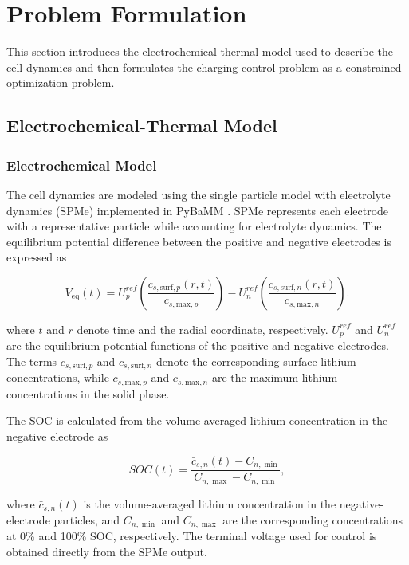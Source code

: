 \section{Problem Formulation}

This section introduces the electrochemical-thermal model used to describe the cell dynamics and then formulates the charging control problem as a constrained optimization problem.

\subsection{Electrochemical-Thermal Model}

\subsubsection{Electrochemical Model}

The cell dynamics are modeled using the single particle model with electrolyte dynamics (SPMe) implemented in PyBaMM \cite{23,25}. SPMe represents each electrode with a representative particle while accounting for electrolyte dynamics. The equilibrium potential difference between the positive and negative electrodes is expressed as

\begin{equation}\label{eqn:voltage}
    V_{\mathrm{eq}}(t)
    =
    U^{ref}_{p}
    \left(
    \frac{c_{s,\mathrm{surf},p}(r,t)}
    {c_{s,\mathrm{max},p}}
    \right)
    -
    U^{ref}_{n}
    \left(
    \frac{c_{s,\mathrm{surf},n}(r,t)}
    {c_{s,\mathrm{max},n}}
    \right).
\end{equation}

where $t$ and $r$ denote time and the radial coordinate, respectively. 
$U^{ref}_{p}$ and $U^{ref}_{n}$ are the equilibrium-potential functions of the positive and negative electrodes. 
The terms $c_{s,\mathrm{surf},p}$ and $c_{s,\mathrm{surf},n}$ denote the corresponding surface lithium concentrations, while $c_{s,\mathrm{max},p}$ and $c_{s,\mathrm{max},n}$ are the maximum lithium concentrations in the solid phase.

The SOC is calculated from the volume-averaged lithium concentration in the negative electrode as

\begin{equation}
    SOC(t)
    =
    \frac{\bar{c}_{s,n}(t)-C_{n,\min}}
    {C_{n,\max}-C_{n,\min}},
\end{equation}

where $\bar{c}_{s,n}(t)$ is the volume-averaged lithium concentration in the negative-electrode particles, and $C_{n,\min}$ and $C_{n,\max}$ are the corresponding concentrations at 0\% and 100\% SOC, respectively. The terminal voltage used for control is obtained directly from the SPMe output.

